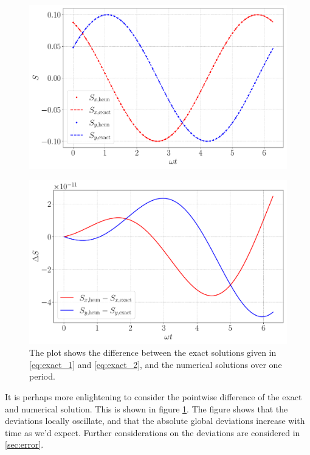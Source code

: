 \begin{figure}[htb]
	\centering
	\begin{minipage}{0.49\columnwidth}
	\includegraphics[width=\columnwidth]{../fig/comparison.pdf}
	\label{fig:comp}
	\end{minipage}
	\hfill
	\centering
	\begin{minipage}{0.49\columnwidth}
	\includegraphics[width=\columnwidth]{../fig/comparison_diff.pdf}
	\caption{The plot shows the difference between the exact solutions given in \eqref{eq:exact_1} and \eqref{eq:exact_2}, and the numerical solutions over one period.}
	\label{fig:comp_diff}
	\end{minipage}
\end{figure} 
It is perhaps more enlightening to consider the pointwise difference of the exact and numerical solution. This is shown in figure \ref{fig:comp_diff}. The figure shows that the deviations locally oscillate, and that the absolute global deviations increase with time as we'd expect. Further considerations on the deviations are considered in \ref{sec:error}.


